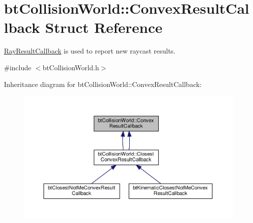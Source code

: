 \hypertarget{structbtCollisionWorld_1_1ConvexResultCallback}{}\section{bt\+Collision\+World\+:\+:Convex\+Result\+Callback Struct Reference}
\label{structbtCollisionWorld_1_1ConvexResultCallback}


\hyperlink{structbtCollisionWorld_1_1RayResultCallback}{Ray\+Result\+Callback} is used to report new raycast results.  




{\ttfamily \#include $<$bt\+Collision\+World.\+h$>$}



Inheritance diagram for bt\+Collision\+World\+:\+:Convex\+Result\+Callback\+:
\nopagebreak
\begin{figure}[H]
\begin{center}
\leavevmode
\includegraphics[width=350pt]{structbtCollisionWorld_1_1ConvexResultCallback__inherit__graph}
\end{center}
\end{figure}
